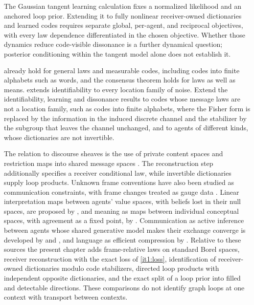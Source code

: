 The Gaussian tangent learning calculation fixes a normalized likelihood and an anchored loop prior. Extending it to fully nonlinear receiver-owned dictionaries and learned codes requires separate global, per-agent, and reciprocal objectives, with every law dependence differentiated in the chosen objective. Whether those dynamics reduce code-visible dissonance is a further dynamical question; posterior conditioning within the tangent model alone does not establish it.

 already hold for general laws and measurable codes, including codes into finite alphabets such as words, and the consensus theorem holds for laws as well as means.  extends identifiability to every location family of noise. Extend the identifiability, learning and dissonance results to codes whose message laws are not a location family, such as codes into finite alphabets, where the Fisher form is replaced by the information in the induced discrete channel and the stabilizer by the subgroup that leaves the channel unchanged, and to agents of different kinds, whose dictionaries are not invertible.

The relation to discourse sheaves is the use of private content spaces and restriction maps into shared message spaces \citep{HansenGhrist2021}. The reconstruction step additionally specifies a receiver conditional law, while invertible dictionaries supply loop products. Unknown frame conventions have also been studied as communication constraints, with frame changes treated as gauge data \citep{BartlettRudolphSpekkens2007,vanEnk2006}. Linear interpretation maps between agents' value spaces, with beliefs lost in their null spaces, are proposed by \citet{Amornbunchornvej2025}, and meaning as maps between individual conceptual spaces, with agreement as a fixed point, by \citet{WarglienGardenfors2013}. Communication as active inference between agents whose shared generative model makes their exchange converge is developed by \citet{FristonFrith2015} and \citet{FristonEtAl2020Language}, and language as efficient compression by \citet{ZaslavskyEtAl2018}. Relative to these sources the present chapter adds frame-relative laws on standard Borel spaces, receiver reconstruction with the exact loss of \cref{it1:loss}, identification of receiver-owned dictionaries modulo code stabilizers, directed loop products with independent opposite dictionaries, and the exact split of a loop prior into filled and detectable directions. These comparisons do not identify graph loops at one context with transport between contexts.
